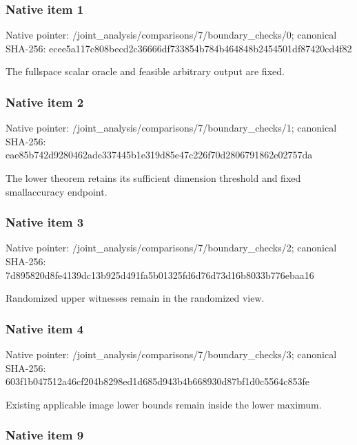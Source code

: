 \documentclass[10pt,a4paper]{article}
\begin{document}
\subsubsection{Native item 1}


Native pointer: /joint\_analysis/comparis\allowbreak{}ons/7/boundary\_checks/0; canonical SHA-256: ecee5a117c808becd2c36666\allowbreak{}df733854b784b464848b2454\allowbreak{}501df87420cd4f82


The fullspace scalar oracle and feasible arbitrary output are fixed.


\subsubsection{Native item 2}


Native pointer: /joint\_analysis/comparis\allowbreak{}ons/7/boundary\_checks/1; canonical SHA-256: eae85b742d9280462ade3374\allowbreak{}45b1e319d85e47c226f70d28\allowbreak{}06791862e02757da


The lower theorem retains its sufficient dimension threshold and fixed smallaccuracy endpoint.


\subsubsection{Native item 3}


Native pointer: /joint\_analysis/comparis\allowbreak{}ons/7/boundary\_checks/2; canonical SHA-256: 7d895820d8fe4139dc13b925\allowbreak{}d491fa5b01325fd6d76d73d1\allowbreak{}6b8033b776ebaa16


Randomized upper witnesses remain in the randomized view.


\subsubsection{Native item 4}


Native pointer: /joint\_analysis/comparis\allowbreak{}ons/7/boundary\_checks/3; canonical SHA-256: 603f1b047512a46cf204b829\allowbreak{}8ed1d685d943b4b668930d87\allowbreak{}bf1d0c5564c853fe


Existing applicable image lower bounds remain inside the lower maximum.


\subsubsection{Native item 9}
\end{document}
